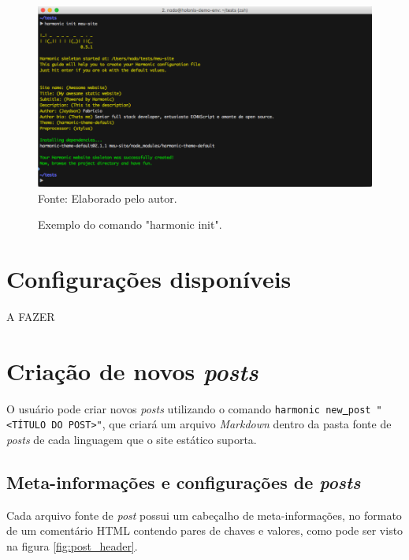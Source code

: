 \documentclass[ppginf, pep]{esinucpel}
\newcommand{\code}[1]{\texttt{#1}}
\begin{document}
\begin{figure}[H]
    \centering
    \caption{Exemplo do comando "harmonic init".}
    \vspace{5pt}
    \includegraphics[width=.85\textwidth]{harmonic_init}
    \\Fonte: Elaborado pelo autor.
    \label{fig:harmonic_init}
\end{figure}

\section{Configurações disponíveis}

A FAZER

\section{Criação de novos \textit{posts}}

O usuário pode criar novos \textit{posts} utilizando o comando \code{harmonic new\underline{ }post "\textless TÍTULO DO POST\textgreater"}, que criará um arquivo \emph{Markdown} dentro da pasta fonte de \textit{posts} de cada linguagem que o site estático suporta.

\subsection{Meta-informações e configurações de \textit{posts}}

Cada arquivo fonte de \textit{post} possui um cabeçalho de meta-informações, no formato de um comentário HTML contendo pares de chaves e valores, como pode ser visto na figura \ref{fig:post_header}.
\end{document}
